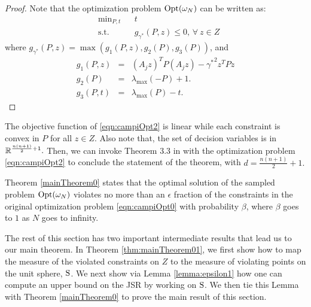 \begin{proof}Note that the optimization problem $\text{Opt}(\omega_N)$
can be written as:
\begin{equation}
\label{eqn:campiOpt2}
\begin{aligned}
& \text{min}_{P, t} & & t \\
& \text{s.t.} 
& & g_{\gamma^*}(P, z) \leq 0,\,\forall\ z \in Z\end{aligned}
\end{equation}
where $g_{\gamma^*}(P,z) = \max(g_1(P, z), g_2(P), g_3(P))$, and 
\begin{eqnarray*}
g_1(P, z) &=& (A_j z)^TP(A_j z) - {\gamma^*}^2 z^TPz \\
g_2(P) &=& \lambda_{\max}(-P) +1. \\
g_3(P,t) &=&  \lambda_{\max}(P) - t.
\end{eqnarray*}
\end{proof}
The objective function of \eqref{eqn:campiOpt2} is linear while each constraint is convex in $P$ for all $z \in Z$. Also note that, the set of decision variables is in $\mathbb{R}^{\frac{n(n+1)}{2}+1}.$  Then, we can invoke Theorem 3.3 in \cite{campi} with the optimization problem \eqref{eqn:campiOpt2} to conclude the statement of the theorem, with $d=\frac{n(n+1)}{2}+1.$

Theorem \ref{mainTheorem0} states that the optimal solution of the sampled problem $\text{Opt}(\omega_N)$ violates no more than an $\epsilon$ fraction of the constraints in the original optimization problem  \eqref{eqn:campiOpt0} with probability $\beta$, where $\beta$ goes to $1$ as $N$ goes to infinity.

The rest of this section has two important intermediate results that lead us to our main theorem.  
In Theorem \ref{thm:mainTheorem01}, we first show how to map the measure of the violated constraints on $Z$ to the measure of violating points on the unit sphere, $\text{S}$. We next show via Lemma \ref{lemma:epsilon1} how one can compute an upper bound on the JSR by working on $\text{S}$. We then tie this Lemma with Theorem \ref{mainTheorem0} to prove the main result of this section. 

